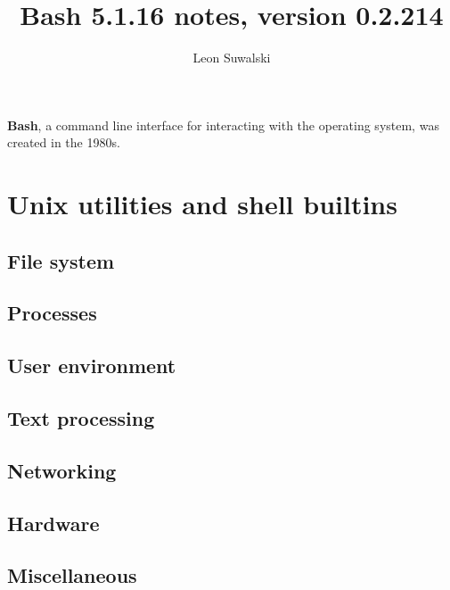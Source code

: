 \documentclass{charun}
\title{Bash 5.1.16 notes, version 0.2.214}
\author{Leon Suwalski}
\begin{document}
\begin{multicols*}{3}
\maketitle
\raggedright

\textbf{Bash}, a command line interface for interacting with the operating system, was created in the 1980s.










\newpage
\section{Unix utilities and shell builtins}
\subsection{File system}


\subsection{Processes}


\subsection{User environment}


\subsection{Text processing}


\subsection{Networking}


\subsection{Hardware}


\subsection{Miscellaneous}


\end{multicols*}
\end{document}
